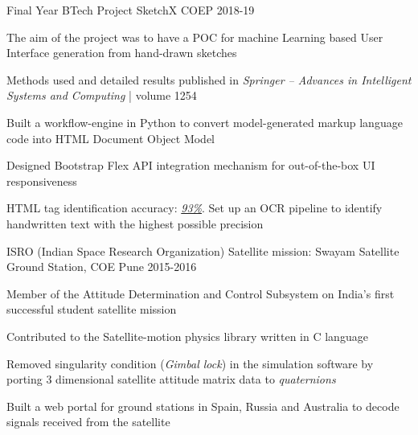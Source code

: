 
\begin{cventries}

    \cventry
    {Final Year BTech Project} %
    {SketchX} %
    {COEP} %
    {2018-19} %
    {
      \begin{cvitems} %
      	\item {The aim of the project was to have a POC for machine Learning based User Interface generation from hand-drawn sketches}
      	 \item {Methods used and detailed results published in \textit{Springer – Advances in Intelligent Systems and Computing} | volume 1254
        }
      	\item {Built a workflow-engine in Python to convert model-generated markup language code into HTML Document Object Model}
      	\item{Designed Bootstrap Flex API integration mechanism for out-of-the-box UI responsiveness}
      	\item {HTML tag identification accuracy: \underline{\textit{93\%}}. Set up an OCR pipeline to identify handwritten text with the highest possible precision}
      \end{cvitems}
    }
    
    
  \cventry
    {ISRO (Indian Space Research Organization)} %
    {Satellite mission: Swayam} %
    {Satellite Ground Station, COE Pune} %
    {2015-2016} %
    {
      \begin{cvitems} %
        \item {Member of the Attitude Determination and Control Subsystem on India's first successful student satellite mission}
        \item {Contributed to the Satellite-motion physics library written in C language}
		\item {Removed singularity condition (\textit{Gimbal lock}) in the simulation software by porting 3 dimensional satellite attitude matrix data to \textit{quaternions}}
		\item {Built a web portal for ground stations in Spain, Russia and Australia to decode signals received from the satellite}
      \end{cvitems}
    }
\end{cventries}